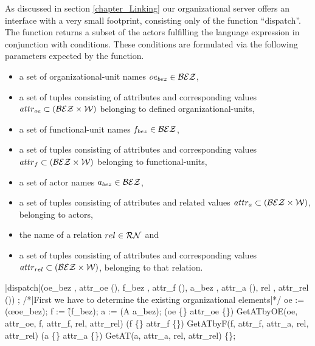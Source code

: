 As discussed in section \ref{chapter_Linking} our organizational server offers an interface with a very small footprint, consisting only of the function "`dispatch"'. The function returns a subset of the actors fulfilling the language expression in conjunction with conditions. These conditions are formulated via the following parameters expected by the function.
\begin{itemize}
	\item a set of organizational-unit names $oe_{bez} \in \mathcal{BEZ}$,
	\item a set of tuples consisting of attributes and corresponding values $attr_{oe} \subset (\mathcal{BEZ} \times \mathcal{W})$ belonging to defined organizational-units,
	\item a set of functional-unit names $f_{bez} \in \mathcal{BEZ}$,
	\item a set of tuples consisting of attributes and corresponding values $attr_{f} \subset (\mathcal{BEZ} \times \mathcal{W})$ belonging to functional-units,
	\item a set of actor names $a_{bez} \in \mathcal{BEZ}$,
	\item a set of tuples consisting of attributes and related values $attr_{a} \subset (\mathcal{BEZ} \times \mathcal{W})$, belonging to actors,
	\item the name of a relation $rel \in \mathcal{RN}$ and
	\item a set of tuples consisting of attributes and corresponding values $attr_{rel} \subset (\mathcal{BEZ} \times \mathcal{W})$, belonging to that relation.
\end{itemize}


	\begin{samepage}
	{\small
	\NumberProgramstrue
	\begin{algorithm}[dispatch]\label{alg:GetIt}
	\begin{program}
	\FUNCT |dispatch|(oe_{bez} \subset \Bezeichner, attr_{oe} \subset (\Bezeichner \times \WerteMenge),
	f_{bez} \subset \Bezeichner, attr_f \subset (\Bezeichner \times \WerteMenge),
	a_{bez} \subset \Bezeichner, attr_a \subset (\Bezeichner \times \WerteMenge),
	rel \in \relname, attr_{rel} \subset (\Bezeichner \times \WerteMenge)) \subset \a
	\BEGIN
	\var {};
	/*|First we have to determine the existing organizational elements|*/
	oe := (\oe \rhd oe_{bez});
	f := (\f \rhd f_{bez});
	a := (A \rhd a_{bez});
	\IF (oe \neq \{\} \vee attr_{oe} \neq \{\}) \label{alg:GetIt:CallGetATbyOE}
	\THEN \RETURN \quad GetATbyOE(oe, attr_{oe}, f, attr_f, rel, attr_{rel})
	\FI
	\IF (f \neq \{\} \vee attr_f \neq \{\})
	\THEN \RETURN \quad GetATbyF(f, attr_f, attr_a, rel, attr_{rel})
	\FI
	\IF (a \neq \{\} \vee attr_a \neq \{\})
	\THEN \RETURN \quad GetAT(a, attr_a, rel, attr_{rel})
	\FI
	\RETURN \{\};
	\END
	\end{program}
	\end{algorithm}
	\NumberProgramsfalse
	}
	\end{samepage}

